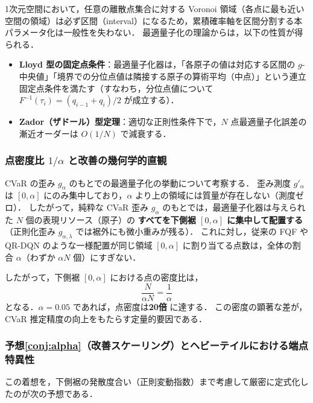 \documentclass[a4paper,10pt]{jsarticle}
\theoremstyle{definition}
\begin{document}
1次元空間において，任意の離散点集合に対する Voronoi 領域（各点に最も近い空間の領域）は必ず区間（interval）になるため，累積確率軸を区間分割する本パラメータ化は一般性を失わない．
最適量子化の理論からは，以下の性質が得られる．
\begin{itemize}
  \item \textbf{Lloyd 型の固定点条件}：最適量子化器は，「各原子の値は対応する区間の $g$-中央値」「境界での分位点値は隣接する原子の算術平均（中点）」という連立固定点条件を満たす（すなわち，分位点値について $F^{-1}(\tau_i) = (q_{i-1}+q_i)/2$ が成立する）．
  \item \textbf{Zador（ザドール）型定理}：適切な正則性条件下で，$N$ 点最適量子化誤差の漸近オーダーは $O(1/N)$ で減衰する．
\end{itemize}

\subsubsection{点密度比 $1/\alpha$ と改善の幾何学的直観}
CVaR の歪み $g_\alpha$ のもとでの最適量子化の挙動について考察する．
歪み測度 $g'_\alpha$ は $[0, \alpha]$ にのみ集中しており，$\alpha$ より上の領域には質量が存在しない（測度ゼロ）．
したがって，純粋な CVaR 歪み $g_\alpha$ のもとでは，最適量子化器は与えられた $N$ 個の表現リソース（原子）の \textbf{すべてを下側裾 $[0, \alpha]$ に集中して配置する}（正則化歪み $g_{\alpha,\lambda}$ では裾外にも微小重みが残る）．
これに対し，従来の FQF や QR-DQN のような一様配置が同じ領域 $[0, \alpha]$ に割り当てる点数は，全体の割合 $\alpha$（わずか $\alpha N$ 個）にすぎない．

したがって，下側裾 $[0, \alpha]$ における点の密度比は，
\begin{equation}
  \frac{N}{\alpha N} = \frac{1}{\alpha}
\end{equation}
となる．$\alpha=0.05$ であれば，点密度は\textbf{20倍} に達する．
この密度の顕著な差が，CVaR 推定精度の向上をもたらす定量的要因である．

\subsubsection{予想\ref{conj:alpha}（改善スケーリング）とヘビーテイルにおける端点特異性}
この着想を，下側裾の発散度合い（正則変動指数）まで考慮して厳密に定式化したのが次の予想である．
\end{document}
